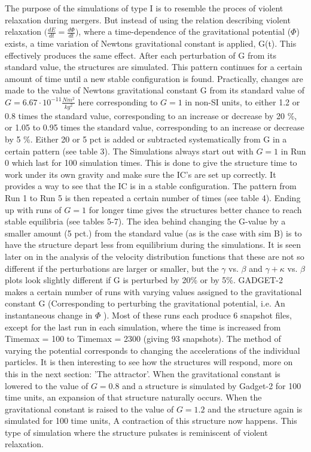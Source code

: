 The purpose of the simulations of type I is to resemble the proces of violent relaxation during mergers. But instead of using the relation describing violent relaxation $\big(\frac{dE}{dt} = \frac{d\Phi}{dt}\big)$, where a time-dependence of the gravitational potential ($\Phi$) exists, a time variation of Newtons gravitational constant is applied, G(t). This effectively produces the same effect. After each perturbation of G from its standard value, the structures are simulated. This pattern continues for a certain amount of time until a new stable configuration is found. Practically, changes are made to the value of Newtons gravitational constant G from its standard value of $G = 6.67 \cdot 10^{-11} \frac{Nm^2}{kg^2}$ here corresponding to $G=1$ in non-SI units, to either 1.2 or 0.8 times the standard value, corresponding to an increase or decrease by 20 \%, or 1.05 to 0.95 times the standard value, corresponding to an increase or decrease by 5 \%. Either 20 or 5 pct is added or subtracted systematically from G in a certain pattern (see table 3). The Simulations always start out with $G = 1$ in Run 0 which last for 100 simulation times. This is done to give the structure time to work under its own gravity and make sure the IC's are set up correctly. It provides a way to see that the IC is in a stable configuration. The pattern from Run 1 to Run 5 is then repeated a certain number of times (see table 4). Ending up with runs of $G=1$ for longer time gives the structures better chance to reach stable equilibria (see tables 5-7). The idea behind changing the G-value by a smaller amount (5 pct.) from the standard value (as is the case with sim B) is to have the structure depart less from equilibrium during the simulations. It is seen later on in the analysis of the velocity distribution functions that these are not so different if the perturbations are larger or smaller, but the $\gamma$ vs. $\beta$ and $\gamma + \kappa$ vs. $\beta$ plots look slightly different if G is perturbed by 20\% or by 5\%. GADGET-2 makes a certain number of runs with varying values assigned to the gravitational constant G (Corresponding to perturbing the gravitational potential, i.e. An instantaneous change in $\Phi$ ). Most of these runs each produce 6 snapshot files, except for the last run in each simulation, where the time is increased from Timemax = 100 to Timemax = 2300 (giving 93 snapshots). The method of varying the potential corresponds to changing the accelerations of the individual particles. It is then interesting to see how the structures will respond, more on this in the next section: 'The attractor'. When the gravitational constant is lowered to the value of $ G = 0.8 $ and a structure is simulated by Gadget-2 for 100 time units, an expansion of that structure naturally occurs. When the gravitational constant is raised to the value of $ G = 1.2 $ and the structure again is simulated for 100 time units, A contraction of this structure now happens. This type of simulation where the structure pulsates is reminiscent of violent relaxation. \\ \\

